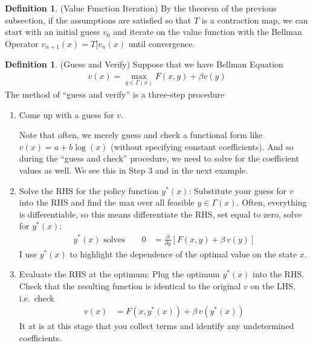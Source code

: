 \documentclass[12pt]{book}
\numberwithin{equation}{section} %
\theoremstyle{plain}
\theoremstyle{definition}
\newtheorem{defn}[thm]{Definition}
\theoremstyle{remark}
\begin{document}
\begin{defn}(Value Function Iteration)
By the theorem of the previous subsection, if the assumptions are
satisfied so that $T$ is a contraction map, we can start with an initial
guess $v_0$ and iterate on the value function with the Bellman Operator
 $v_{n+1}(x)=T[v_n(x)$ until convergence.
\end{defn}

\begin{defn}(Guess and Verify)
Suppose that we have Bellman Equation
\begin{align*}
  v(x) = \max_{y\in\Gamma(x)} F(x,y) + \beta v(y)
\end{align*}
The method of ``guess and verify'' is a three-step procedure
\begin{enumerate}
  \item Come up with a guess for $v$.

    Note that often, we merely guess and check a functional form like
    $v(x)=a + b\log(x)$ (without specifying constant coefficients). And
    so during the ``guess and check'' procedure, we need to solve for
    the coefficient values as well. We see this in Step 3 and in the
    next example.

  \item Solve the RHS for the policy function $y^*(x)$: Substitute your
    guess for $v$ into the RHS and find the max over all feasible
    $y\in\Gamma(x)$.  Often, everything is differentiable, so this means
    differentiate the RHS, set equal to zero, solve for $y^*(x)$:
    \begin{align*}
      \text{$y^*(x)$ solves} \qquad
      0 &= \frac{\partial}{\partial y}
      \left[
        F(x,y) + \beta\, v(y)
      \right]
    \end{align*}
    I use $y^*(x)$ to highlight the dependence of the optimal value on
    the state $x$.

  \item Evaluate the RHS at the optimum: Plug the optimum $y^*(x)$ into
    the RHS. Check that the resulting function is identical to the
    original $v$ on the LHS, i.e.\ check
    \begin{align*}
      v(x) &= F(x,y^*(x)) + \beta\, v(y^*(x))
    \end{align*}
    It at is at this stage that you collect terms and identify any
    undetermined coefficients.
\end{enumerate}
\end{defn}
\end{document}
